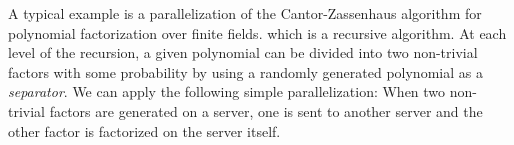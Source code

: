 A typical example is a parallelization of the Cantor-Zassenhaus
algorithm for polynomial factorization over finite fields.
which is a recursive algorithm.
At each level of the recursion, a given polynomial can be
divided into two non-trivial factors with some probability by using 
a randomly generated polynomial as a {\it separator}.
We can apply the following simple parallelization:
When two non-trivial factors are generated on a server,
one is sent to another server and the other factor is factorized on the server
itself. 
%
%
%
%
%
%
%
